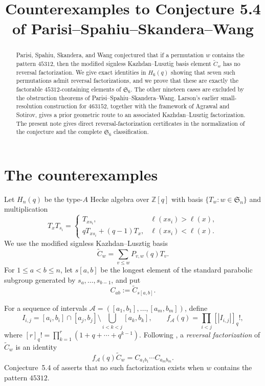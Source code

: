 \documentclass[11pt]{amsart}
\title[Counterexamples to Conjecture 5.4]
{Counterexamples to Conjecture 5.4 of
Parisi--Spahiu--Skandera--Wang}
\date{}
\theoremstyle{remark}
\newcommand{\Sn}{\mathfrak S_n}
\newcommand{\Ssix}{\mathfrak S_6}
\newcommand{\Ct}{\widetilde C}
\newcommand{\Cab}[2]{C_{#1#2}}
\begin{document}
\begin{abstract}
Parisi, Spahiu, Skandera, and Wang conjectured that if a permutation
$w$ contains the pattern $45312$, then the modified signless
Kazhdan--Lusztig basis element $\Ct_w$ has no reversal factorization.
We give exact identities in $H_6(q)$ showing that seven such
permutations admit reversal factorizations, and we prove that these are
exactly the factorable $45312$-containing elements of $\Ssix$.
The other nineteen cases are excluded by the obstruction theorems of
Parisi--Spahiu--Skandera--Wang. Larson's earlier small-resolution
construction for $463152$, together with the framework of Agrawal and
Sotirov, gives a prior geometric route to an associated
Kazhdan--Lusztig factorization. The present note gives direct
reversal-factorization certificates in the normalization of the
conjecture and the complete $\Ssix$ classification.
\end{abstract}

\maketitle

\section{The counterexamples}

Let $H_n(q)$ be the type-$A$ Hecke algebra over $\mathbb Z[q]$ with
basis $\{T_w:w\in\Sn\}$ and multiplication
\[
T_xT_{s_i}=
\begin{cases}
T_{xs_i},&\ell(xs_i)>\ell(x),\\
qT_{xs_i}+(q-1)T_x,&\ell(xs_i)<\ell(x).
\end{cases}
\]
We use the modified signless Kazhdan--Lusztig basis
\cite{KazhdanLusztig}
\[
\Ct_w=\sum_{v\leq w}P_{v,w}(q)T_v.
\]
For $1\leq a<b\leq n$, let $s[a,b]$ be the longest element of the
standard parabolic subgroup generated by $s_a,\ldots,s_{b-1}$, and put
\[
\Cab{a}{b}:=\Ct_{s[a,b]}.
\]

For a sequence of intervals
$\mathcal A=([a_1,b_1],\ldots,[a_m,b_m])$, define
\[
I_{i,j}=[a_i,b_i]\cap[a_j,b_j]\setminus
\bigcup_{i<k<j}[a_k,b_k],
\qquad
f_{\mathcal A}(q)=\prod_{i<j}[|I_{i,j}|]_q!,
\]
where $[r]_q!=\prod_{k=1}^r(1+q+\cdots+q^{k-1})$.
Following \cite[Sec.~3]{ParisiEtAl}, a \emph{reversal factorization}
of $\Ct_w$ is an identity
\[
f_{\mathcal A}(q)\Ct_w
 =\Cab{a_1}{b_1}\cdots\Cab{a_m}{b_m}.
\]
Conjecture~5.4 of \cite{ParisiEtAl} asserts that no such factorization
exists when $w$ contains the pattern $45312$.
\end{document}
